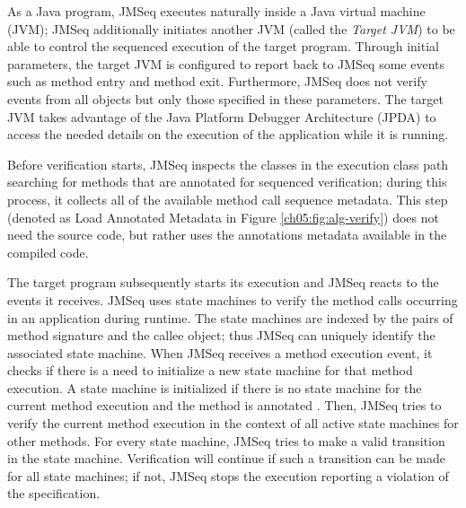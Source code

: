 As a Java program, JMSeq executes naturally inside a Java virtual machine (JVM); JMSeq additionally initiates another JVM (called the \textsl{Target JVM}) to be able to control the sequenced execution of the target program.
Through initial parameters, the target JVM is configured to report back to JMSeq some events such as method entry and method exit.
Furthermore, JMSeq does not verify events from all objects but only those specified in these parameters. 
The target JVM takes advantage of the Java Platform Debugger Architecture (JPDA) to access the needed details on the execution of the application while it is running. 

Before verification starts, JMSeq inspects the classes in the execution class path searching for methods that are annotated for sequenced verification; during this process, it collects all of the available method call sequence metadata. 
This step (denoted as Load Annotated Metadata in Figure \ref{ch05:fig:alg-verify}) does not need the source code, but rather uses the annotations metadata available in the compiled code.

The target program subsequently starts its execution and JMSeq reacts to the events it receives.
JMSeq uses state machines to verify the method calls occurring in an application during runtime.
The state machines are indexed by the pairs of method signature and the callee object; thus JMSeq can uniquely identify the associated state machine.
When JMSeq receives a method execution event, it checks if there is a need to initialize a new state machine for that method execution.
A state machine is initialized if there is no state machine for the current method execution and the method is annotated  .
Then, JMSeq tries to verify the current method execution in the context of all active state machines for other methods.
For every state machine, JMSeq tries to make a valid transition in the state machine. 
Verification will continue if such a transition can be made for all state machines; 
if not, JMSeq stops the execution reporting a violation of the specification. 


